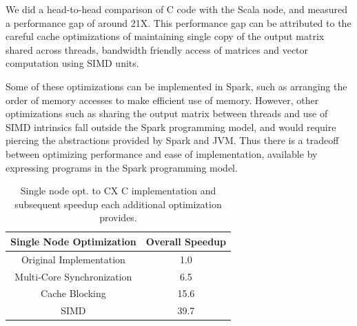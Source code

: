 


 We did a head-to-head comparison of C code with the Scala node, 
 and measured a performance gap of around 21X.
 This performance gap can be attributed to the careful cache
 optimizations of maintaining single copy of the output matrix shared
 across threads, bandwidth friendly access of matrices and vector
 computation using SIMD units.

 Some of these optimizations can be implemented in Spark, such as arranging the
 order of memory accesses to make efficient use of memory. %
 However, other optimizations such as sharing the output matrix between threads
 and use of SIMD intrinsics fall outside the Spark programming model, and would
 require piercing the abstractions provided by Spark and JVM.
 Thus there is a tradeoff between optimizing performance 
 and ease of implementation, %
 available by expressing programs in the Spark programming model.

 
  \begin{table}
  \begin{center}
  \begin{tabular}{ |c|c| } 
  \hline
  Single Node Optimization & Overall Speedup\\
  \hline
  Original Implementation & 1.0  \\
  Multi-Core Synchronization & 6.5 \\
  Cache Blocking & 15.6 \\
  SIMD & 39.7 \\
  \hline

  \end{tabular}
  \end{center}
  \caption{Single node opt. to CX C implementation and
  subsequent speedup  each additional optimization provides.}
  \label{tab:single_node}
  \end{table}
 



